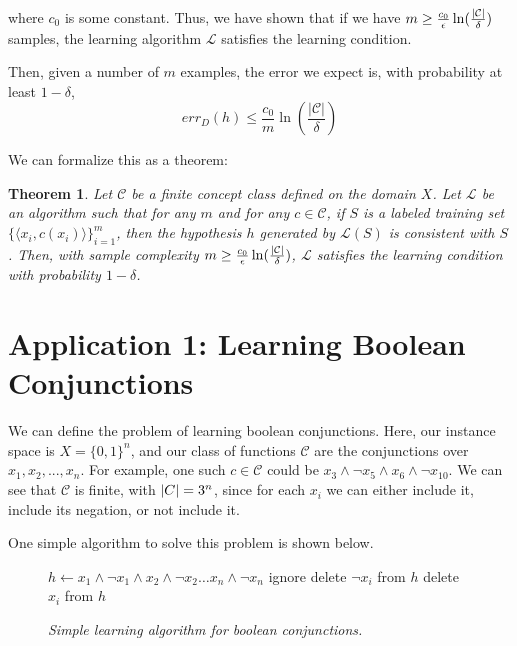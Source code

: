 \documentclass{article}
\newtheorem{thm}{Theorem}
\DeclarePairedDelimiter\abs{\lvert}{\rvert}
\begin{document}
where $c_0$ is some constant. Thus, we have shown that if we have
$m \geq \frac{c_0}{\epsilon} \ln(\frac{\abs{\mathcal{C}}}{\delta})$
samples, the learning algorithm $\mathcal{L}$ satisfies the learning
condition.

Then, given a number of $m$ examples, the error we expect is, with
probability at least $1-\delta$,
$$err_D(h) \leq \frac{c_0}{m}\ln(\frac{|\mathcal{C}|}{\delta})$$

We can formalize this as a theorem:

\begin{framed}
\begin{thm}
    Let $\mathcal{C}$ be a finite concept class defined on the domain
    $X$. Let $\mathcal{L}$ be an algorithm such that for any $m$ and for
    any $c \in \mathcal{C}$, if $S$ is a labeled training set
    $\{\langle x_i, c(x_i) \rangle\}_{i=1}^m$, then the hypothesis $h$
    generated by $\mathcal{L}(S)$ is consistent with $S$. Then, with
    sample complexity
    $m \geq \frac{c_0}{\epsilon}\ln(\frac{\abs{\mathcal{C}}}{\delta})$,
    $\mathcal{L}$ satisfies the learning condition with
    probability $1-\delta$.
\end{thm}
\end{framed}


\section{Application 1: Learning Boolean Conjunctions}
We can define the problem of learning boolean conjunctions. Here, our instance
space is $X = \{0, 1\}^n$, and our class of functions $\mathcal{C}$ are the
conjunctions over $x_1, x_2, ..., x_n$. For example, one such $c \in \mathcal{C}$
could be $x_3 \wedge \neg x_5 \wedge x_6 \wedge \neg x_{10}$. We can see that
$\mathcal{C}$ is finite, with $\abs{C} = 3^n$, since for
each $x_i$ we can either include it, include its negation, or not include it.

One simple algorithm to solve this problem is shown below.

\begin{figure}[H]
\begin{framed}
    \begin{algorithmic}
        \State $h \leftarrow x_1 \wedge \neg x_1 \wedge x_2 \wedge \neg x_2 \dots x_n \wedge \neg x_n$
             \State ignore
            \Else {} \State delete $\neg x_i$ from $h$
                \Else
                \State delete $x_i$ from $h$
                \EndIf
            \EndIf
        \EndFor
    \end{algorithmic}
\end{framed}
\begin{center}
    \emph{Simple learning algorithm for boolean conjunctions.}
\end{center}
\end{figure}
\end{document}
